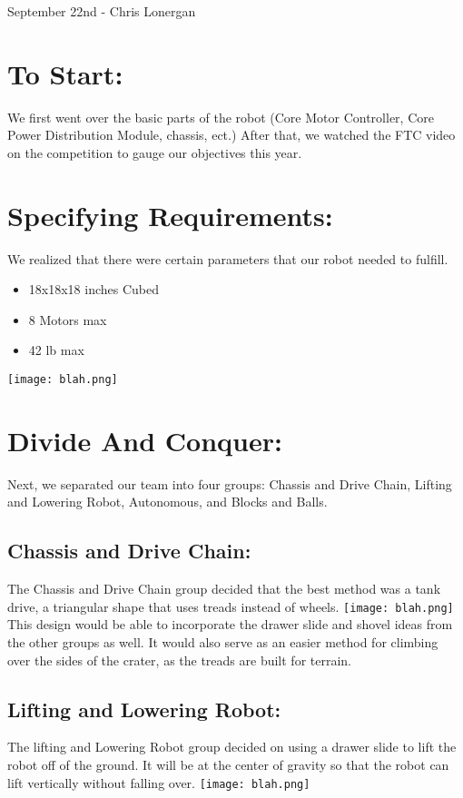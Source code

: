 \documentclass[12pt]{article}
\begin{document}
\begin{center}
September 22nd - Chris Lonergan
\end{center}

\section{To Start:}
We first went over the basic parts of the robot (Core Motor Controller, Core Power Distribution Module, chassis, ect.) After that, we watched the FTC video on the competition to gauge our objectives this year. 

\section{Specifying Requirements:}
We realized that there were certain parameters that our robot needed to fulfill. 
\begin{itemize}
	\item 18x18x18 inches Cubed
	\item 8 Motors max
	\item 42 lb max
\end{itemize}
\texttt{[image: blah.png]}%

\section{Divide And Conquer:}
Next, we separated our team into four groups: Chassis and Drive Chain, Lifting and Lowering Robot, Autonomous, and Blocks and Balls.

\subsection{Chassis and Drive Chain:}
The Chassis and Drive Chain group decided that the best method was a tank drive, a triangular shape that uses treads instead of wheels. 
\texttt{[image: blah.png]}%
This design would be able to incorporate the drawer slide and shovel ideas from the other groups as well. It would also serve as an easier method for climbing over the sides of the crater, as the treads are built for terrain.

\subsection{Lifting and Lowering Robot:}
The lifting and Lowering Robot group decided on using a drawer slide to lift the robot off of the ground. It will be at the center of gravity so that the robot can lift vertically without falling over. 
\texttt{[image: blah.png]}%
\end{document}
